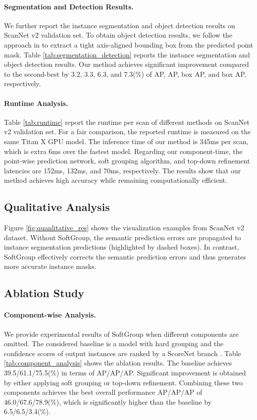 \documentclass[10pt,twocolumn,letterpaper]{article}
\begin{document}
	
	
	
	\paragraph{Segmentation and Detection Results.}
	We further report the instance segmentation and object detection results on ScanNet v2 validation set. To obtain object detection results, we follow the approach in \cite{engelmann20203d} to extract a tight axis-aligned bounding box from the predicted point mask. Table \ref{tab:segmentation_detection} reports the instance segmentation and object detection results. Our method achieves significant improvement compared to the second-best by 3.2, 3.3, 6.3, and 7.3(\%) of AP, AP, box AP, and box AP, respectively.
	
	\paragraph{Runtime Analysis.}
	Table \ref{tab:runtime} report the runtime per scan of different methods on ScanNet v2 validation set. For a fair comparison, the reported runtime is measured on the same Titan X GPU model. The inference time of our method is 345ms per scan, which is extra 6ms over the fastest model. Regarding our component-time, the point-wise prediction network, soft grouping algorithm, and top-down refinement latencies are 152ms, 132ms, and 70ms, respectively. The results show that our method achieves high accuracy while remaining computationally efficient. 
	
	\subsection{Qualitative Analysis}
	Figure \ref{fig:quanlitative_res} shows the visualization examples from ScanNet v2 dataset. Without SoftGroup, the semantic prediction errors are propagated to instance segmentation predictions (highlighted by dashed boxes). In contrast, SoftGroup effectively corrects the semantic prediction errors and thus generates more accurate instance masks.
	
	\subsection{Ablation Study}
	\paragraph{Component-wise Analysis.}
	We provide experimental results of SoftGroup when different components are omitted. The considered baseline is a model with hard grouping and the confidence scores of output instances are ranked by a ScoreNet branch \cite{jiang2020pointgroup,liang2021instance}. Table \ref{tab:component_analysis} shows the ablation results. The baseline achieves 39.5/61.1/75.5(\%) in terms of AP/AP/AP. Significant improvement is obtained by either applying soft grouping or top-down refinement. Combining these two components achieves the best overall performance AP/AP/AP of 46.0/67.6/78.9(\%), which is significantly higher than the baseline by 6.5/6.5/3.4(\%).
	
\end{document}
